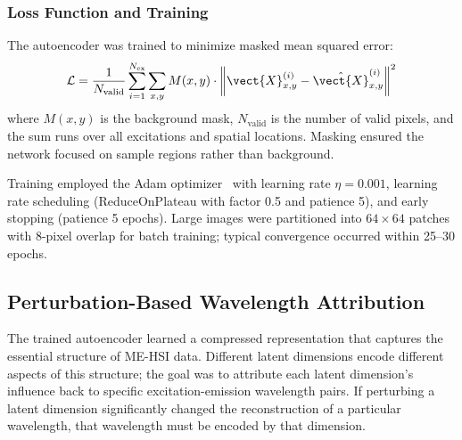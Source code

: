\subsubsection{Loss Function and Training}
The autoencoder was trained to minimize masked mean squared error:
\begin{equation}
\mathcal{L} = \frac{1}{N_{\text{valid}}} \sum_{i=1}^{N_{\text{ex}}} \sum_{x,y} M(x,y) \cdot \left\| \vect{X}^{(i)}_{x,y} - \hat{\vect{X}}^{(i)}_{x,y} \right\|^2
\label{eq:loss}
\end{equation}
where $M(x,y)$ is the background mask, $N_{\text{valid}}$ is the number of valid pixels, and the sum runs over all excitations and spatial locations.
Masking ensured the network focused on sample regions rather than background.

Training employed the Adam optimizer~\cite{kingma2014adam} with learning rate $\eta = 0.001$, learning rate scheduling (ReduceOnPlateau with factor 0.5 and patience 5), and early stopping (patience 5 epochs).
Large images were partitioned into $64 \times 64$ patches with 8-pixel overlap for batch training; typical convergence occurred within 25--30 epochs.

\subsection{Perturbation-Based Wavelength Attribution}
\label{sec:perturbation}

The trained autoencoder learned a compressed representation that captures the essential structure of ME-HSI data.
Different latent dimensions encode different aspects of this structure; the goal was to attribute each latent dimension's influence back to specific excitation-emission wavelength pairs.
If perturbing a latent dimension significantly changed the reconstruction of a particular wavelength, that wavelength must be encoded by that dimension.

